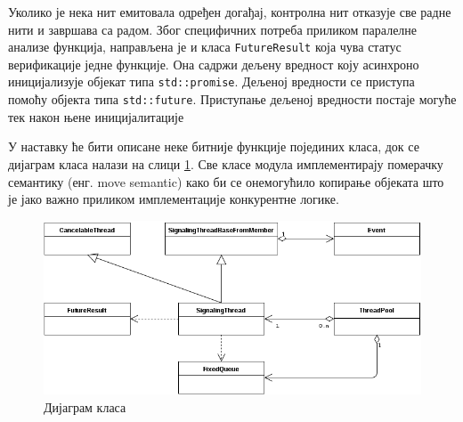 \documentclass[12pt,oneside]{memoir}
\begin{document}
Уколико је нека нит емитовала одређен догађај, контролна нит отказује све радне нити и завршава са радом.
Због специфичних потреба приликом паралелне анализе функција, направљена је и класа \texttt{FutureResult} која чува статус верификације једне функције. Она садржи дељену вредност коју асинхроно иницијализује објекат типа \texttt{std::promise}. Дељеној вредности се приступа помоћу објекта типа \texttt{std::future}. Приступање дељеној вредности постаје могуће тек након њене иницијалитације


У наставку ће бити описане неке битније функције појединих класа, док се дијаграм класа налази на слици \ref{fig:klasa_dij}. Све класе модула имплементирају померачку семантику (енг. move semantic) како би се онемогућило копирање објеката што је јако важно приликом имплементације конкурентне логике. 

 \begin{figure}[!ht]
  \centering
  \includegraphics[width=1.0\textwidth]{class_diag.png}
  \caption{Дијаграм класа}
  \label{fig:klasa_dij}
\end{figure}
\end{document}
